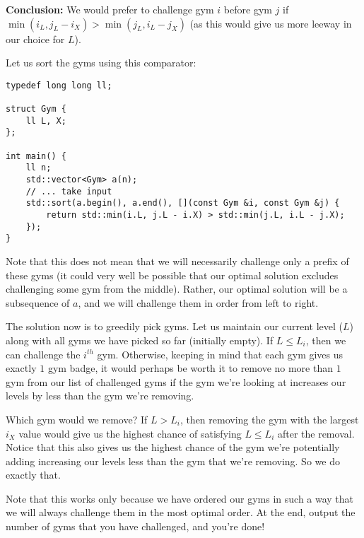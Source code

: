 \documentclass{article}
\begin{document}
\textbf{Conclusion:} We would prefer to challenge gym $i$ before gym $j$ if $\min(i_L,j_L-i_X) > \min(j_L,i_L-j_X)$ (as this would give us more leeway in our choice for $L$).

Let us sort the gyms using this comparator:
\begin{verbatim}
typedef long long ll;

struct Gym {
    ll L, X;
};

int main() {
    ll n;
    std::vector<Gym> a(n);
    // ... take input
    std::sort(a.begin(), a.end(), [](const Gym &i, const Gym &j) {
        return std::min(i.L, j.L - i.X) > std::min(j.L, i.L - j.X);
    });
}
\end{verbatim}
 
Note that this does not mean that we will necessarily challenge only a prefix of these gyms (it could very well be possible that our optimal solution excludes challenging some gym from the middle). Rather, our optimal solution will be a subsequence of $a$, and we will challenge them in order from left to right.

The solution now is to greedily pick gyms. Let us maintain our current level ($L$) along with all gyms we have picked so far (initially empty). If $L\le L_i$, then we can challenge the $i^{th}$ gym. Otherwise, keeping in mind that each gym gives us exactly $1$ gym badge, it would perhaps be worth it to remove no more than $1$ gym from our list of challenged gyms if the gym we're looking at increases our levels by less than the gym we're removing.

Which gym would we remove? If $L>L_i$, then removing the gym with the largest $i_X$ value would give us the highest chance of satisfying $L\le L_i$ after the removal. Notice that this also gives us the highest chance of the gym we're potentially adding increasing our levels less than the gym that we're removing. So we do exactly that.

Note that this works only because we have ordered our gyms in such a way that we will always challenge them in the most optimal order. At the end, output the number of gyms that you have challenged, and you're done!
\end{document}
